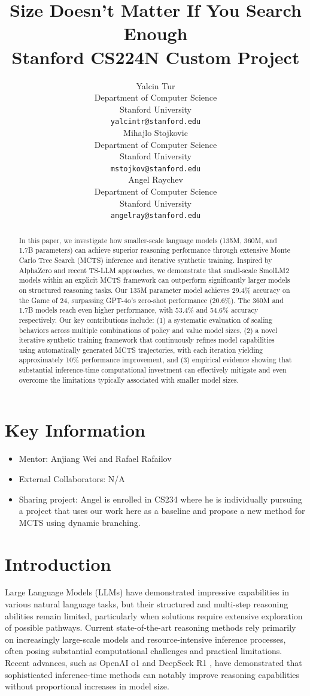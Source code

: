\documentclass{article}
\title{
  Size Doesn't Matter If You Search Enough\\
  \vspace{1em}
  \small{\normalfont Stanford CS224N Custom Project} 
}
\author{
  Yalcin Tur \\
  Department of Computer Science \\
  Stanford University \\
  \texttt{yalcintr@stanford.edu} \\
\And
   Mihajlo Stojkovic \\
   Department of Computer Science \\
   Stanford University \\
   \texttt{mstojkov@stanford.edu} \\
   \And
   Angel Raychev \\
   Department of Computer Science \\
   Stanford University \\
   \texttt{angelray@stanford.edu}
}
\begin{document}
\maketitle


\begin{abstract}
In this paper, we investigate how smaller-scale language models (135M, 360M, and 1.7B parameters) can achieve superior reasoning performance through extensive Monte Carlo Tree Search (MCTS) inference and iterative synthetic training. Inspired by AlphaZero and recent TS-LLM approaches, we demonstrate that small-scale SmolLM2 models within an explicit MCTS framework can outperform significantly larger models on structured reasoning tasks. Our 135M parameter model achieves 29.4\% accuracy on the Game of 24, surpassing GPT-4o's zero-shot performance (20.6\%). The 360M and 1.7B models reach even higher performance, with 53.4\% and 54.6\% accuracy respectively. Our key contributions include: (1) a systematic evaluation of scaling behaviors across multiple combinations of policy and value model sizes, (2) a novel iterative synthetic training framework that continuously refines model capabilities using automatically generated MCTS trajectories, with each iteration yielding approximately 10\% performance improvement, and (3) empirical evidence showing that substantial inference-time computational investment can effectively mitigate and even overcome the limitations typically associated with smaller model sizes.
\end{abstract}

\section{Key Information}
\begin{itemize}
    \item Mentor: Anjiang Wei and Rafael Rafailov
    \item External Collaborators: N/A
    \item Sharing project: Angel is enrolled in CS234 where he is individually pursuing a project that uses our work here as a baseline and propose a new method for MCTS using dynamic branching.
\end{itemize}


\section{Introduction}
Large Language Models (LLMs) \cite{dubey2024llama, achiam2023gpt, jiang2024mixtral} have demonstrated impressive capabilities in various natural language tasks, but their structured and multi-step reasoning abilities remain limited, particularly when solutions require extensive exploration of possible pathways. Current state-of-the-art reasoning methods rely primarily on increasingly large-scale models and resource-intensive inference processes, often posing substantial computational challenges and practical limitations. Recent advances, such as OpenAI o1 \cite{zhong2024evaluationopenaio1opportunities} and DeepSeek R1 \cite{deepseekai2025deepseekr1incentivizingreasoningcapability}, have demonstrated that sophisticated inference-time methods can notably improve reasoning capabilities without proportional increases in model size.
\end{document}
